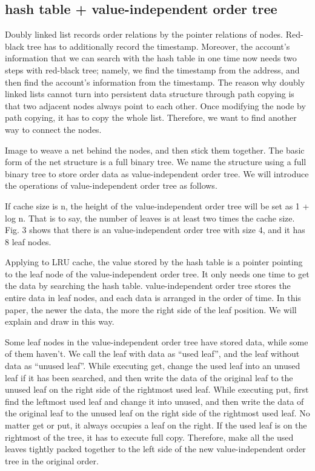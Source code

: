 \documentclass[conference]{IEEEtran}
\begin{document}
\subsection{hash table + value-independent order tree}
Doubly linked list records order relations by the pointer relations of nodes. Red-black tree has to additionally record the timestamp. Moreover, the account’s information that we can search with the hash table in one time now needs two steps with red-black tree; namely, we find the timestamp from the address, and then find the account's information from the timestamp.
The reason why doubly linked lists cannot turn into persistent data structure through path copying is that two adjacent nodes always point to each other. Once modifying the node by path copying, it has to copy the whole list. Therefore, we want to find another way to connect the nodes.

Image to weave a net behind the nodes, and then stick them together.
The basic form of the net structure is a full binary tree. We name the structure using a full binary tree to store order data as value-independent order tree. We will introduce the operations of value-independent order tree as follows.

If cache size is n, the height of the value-independent order tree will be set as 1 + log n. That is to say, the number of leaves is at least two times the cache size. Fig. 3 shows that there is an value-independent order tree with size 4, and it has 8 leaf nodes.

Applying to LRU cache, the value stored by the hash table is a pointer pointing to the leaf node of the value-independent order tree. It only needs one time to get the data by searching the hash table. 
value-independent order tree stores the entire data in leaf nodes, and each data is arranged in the order of time. In this paper, the newer the data, the more the right side of the leaf position. We will explain and draw in this way.

Some leaf nodes in the value-independent order tree have stored data, while some of them haven’t. We call the leaf with data as “used leaf”, and the leaf without data as “unused leaf”.
While executing get, change the used leaf into an unused leaf if it has been searched, and then write the data of the original leaf to the unused leaf on the right side of the rightmost used leaf. While executing put, first find the leftmost used leaf and change it into unused, and then write the data of the original leaf to the unused leaf on the right side of the rightmost used leaf. No matter get or put, it always occupies a leaf on the right. If the used leaf is on the rightmost of the tree, it has to execute full copy. Therefore, make all the used leaves tightly packed together to the left side of the new value-independent order tree in the original order.
\end{document}
